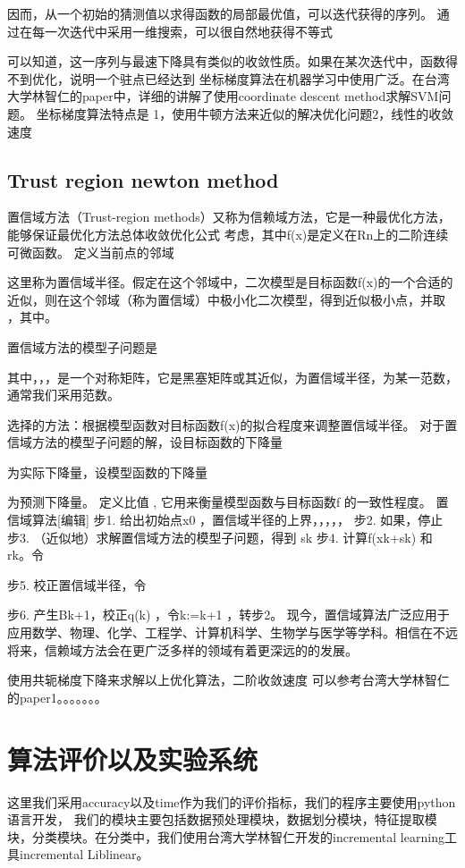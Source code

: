 \documentclass[master]{njuthesis}
\begin{document}
因而，从一个初始的猜测值以求得函数的局部最优值，可以迭代获得的序列。
通过在每一次迭代中采用一维搜索，可以很自然地获得不等式

可以知道，这一序列与最速下降具有类似的收敛性质。如果在某次迭代中，函数得不到优化，说明一个驻点已经达到
坐标梯度算法在机器学习中使用广泛。在台湾大学林智仁的paper中，详细的讲解了使用coordinate descent method求解SVM问题。
坐标梯度算法特点是 1，使用牛顿方法来近似的解决优化问题2，线性的收敛速度

\subsection{Trust region newton method}

置信域方法（Trust-region methods）又称为信赖域方法，它是一种最优化方法，能够保证最优化方法总体收敛优化公式
考虑，其中ƒ(x)是定义在Rn上的二阶连续可微函数。 定义当前点的邻域

这里称为置信域半径。假定在这个邻域中，二次模型是目标函数ƒ(x)的一个合适的近似，则在这个邻域（称为置信域）中极小化二次模型，得到近似极小点，并取 ，其中。

置信域方法的模型子问题是

其中，，，是一个对称矩阵，它是黑塞矩阵或其近似，为置信域半径，为某一范数，通常我们采用范数。

选择的方法：根据模型函数对目标函数ƒ(x)的拟合程度来调整置信域半径。 对于置信域方法的模型子问题的解，设目标函数的下降量

为实际下降量，设模型函数的下降量

为预测下降量。 定义比值
,
它用来衡量模型函数与目标函数ƒ 的一致性程度。
置信域算法[编辑]
步1. 给出初始点x0 ，置信域半径的上界，，，，，
步2. 如果，停止
步3. （近似地）求解置信域方法的模型子问题，得到 sk
步4. 计算ƒ(xk+sk) 和 rk。令

步5. 校正置信域半径，令

步6. 产生Bk+1，校正q(k) ，令k:=k+1 ，转步2。
现今，置信域算法广泛应用于应用数学、物理、化学、工程学、计算机科学、生物学与医学等学科。相信在不远将来，信赖域方法会在更广泛多样的领域有着更深远的的发展。

使用共轭梯度下降来求解以上优化算法，二阶收敛速度
可以参考台湾大学林智仁的paper1。。。。。。。

\section{ 算法评价以及实验系统}
这里我们采用accuracy以及time作为我们的评价指标，我们的程序主要使用python语言开发， 我们的模块主要包括数据预处理模块，数据划分模块，特征提取模块，分类模块。在分类中，我们使用台湾大学林智仁开发的incremental learning工具incremental Liblinear。
\end{document}
